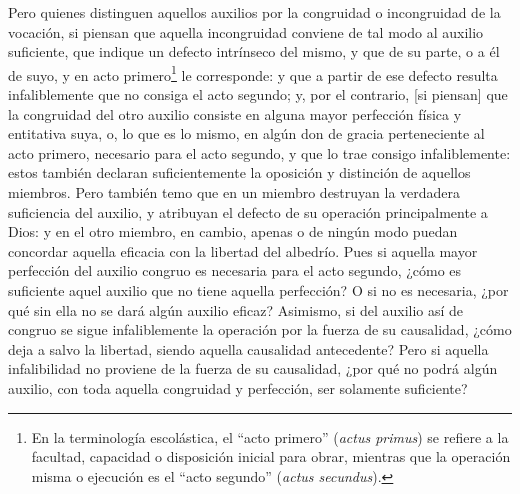 \documentclass{article}
\begin{document}
Pero quienes distinguen aquellos auxilios por la congruidad o incongruidad de la
vocación, si piensan que aquella incongruidad conviene de tal modo al auxilio
suficiente, que indique un defecto intrínseco del mismo, y que de su parte, o a él de
suyo, y en acto primero\footnote{En la terminología escolástica, el \enquote{acto
primero} (\textit{actus primus}) se refiere a la facultad, capacidad o disposición
inicial para obrar, mientras que la operación misma o ejecución es el \enquote{acto
segundo} (\textit{actus secundus}).} le corresponde: y que a partir de ese defecto
resulta infaliblemente que no consiga el acto segundo; y, por el contrario, [si piensan]
que la congruidad del otro auxilio consiste en alguna mayor perfección física y
entitativa suya, o, lo que es lo mismo, en algún don de gracia perteneciente al acto
primero, necesario para el acto segundo, y que lo trae consigo infaliblemente: estos
también declaran suficientemente la oposición y distinción de aquellos miembros. Pero
también temo que en un miembro destruyan la verdadera suficiencia del auxilio, y
atribuyan el defecto de su operación principalmente a Dios: y en el otro miembro, en
cambio, apenas o de ningún modo puedan concordar aquella eficacia con la libertad del
albedrío. Pues si aquella mayor perfección del auxilio congruo es necesaria para el acto
segundo, ¿cómo es suficiente aquel auxilio que no tiene aquella perfección? O si no es
necesaria, ¿por qué sin ella no se dará algún auxilio eficaz? Asimismo, si del auxilio
así de congruo se sigue infaliblemente la operación por la fuerza de su causalidad,
¿cómo deja a salvo la libertad, siendo aquella causalidad antecedente? Pero si aquella
infalibilidad no proviene de la fuerza de su causalidad, ¿por qué no podrá algún
auxilio, con toda aquella congruidad y perfección, ser solamente suficiente?
\end{document}
